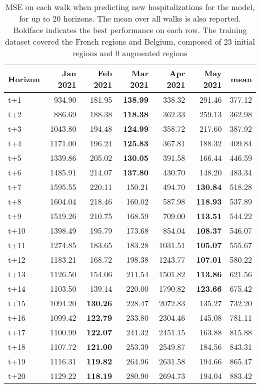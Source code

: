 \begin{table}[H]
\centering
\caption{MSE on each walk when predicting new hospitalizations for the model, for up to 20 horizons. The mean over all walks is also reported. Boldface indicates the best performance on each row. The training dataset covered the French regions and Belgium, composed of 23 initial regions and 0 augmented regions }
\label{tab:MSE_walk_encoder_decoder}
\begin{tabular}{lrrrrrr}
\toprule
Horizon &  Jan 2021 &  Feb 2021 &  Mar 2021 &  Apr 2021 &  May 2021 &   mean \\
\midrule
t+1  & 934.90  & 181.95  & \textbf{138.99}  & 338.32  & 291.46  & 377.12  \\
t+2  & 886.69  & 188.38  & \textbf{118.38}  & 362.33  & 259.13  & 362.98  \\
t+3  & 1043.80  & 194.48  & \textbf{124.99}  & 358.72  & 217.60  & 387.92  \\
t+4  & 1171.00  & 196.24  & \textbf{125.83}  & 367.81  & 188.32  & 409.84  \\
t+5  & 1339.86  & 205.02  & \textbf{130.05}  & 391.58  & 166.44  & 446.59  \\
t+6  & 1485.91  & 214.07  & \textbf{137.80}  & 430.70  & 148.20  & 483.34  \\
t+7  & 1595.55  & 220.11  & 150.21  & 494.70  & \textbf{130.84}  & 518.28  \\
t+8  & 1604.04  & 218.46  & 160.02  & 587.98  & \textbf{118.93}  & 537.89  \\
t+9  & 1519.26  & 210.75  & 168.59  & 709.00  & \textbf{113.51}  & 544.22  \\
t+10  & 1398.49  & 195.79  & 173.68  & 854.04  & \textbf{108.37}  & 546.07  \\
t+11  & 1274.85  & 183.65  & 183.28  & 1031.51  & \textbf{105.07}  & 555.67  \\
t+12  & 1183.21  & 168.72  & 198.38  & 1243.77  & \textbf{107.01}  & 580.22  \\
t+13  & 1126.50  & 154.06  & 211.54  & 1501.82  & \textbf{113.86}  & 621.56  \\
t+14  & 1103.50  & 139.14  & 220.00  & 1790.82  & \textbf{123.66}  & 675.42  \\
t+15  & 1094.20  & \textbf{130.26}  & 228.47  & 2072.83  & 135.27  & 732.20  \\
t+16  & 1099.42  & \textbf{122.79}  & 233.80  & 2304.46  & 145.08  & 781.11  \\
t+17  & 1100.99  & \textbf{122.07}  & 241.32  & 2451.15  & 163.88  & 815.88  \\
t+18  & 1107.72  & \textbf{121.00}  & 253.39  & 2549.87  & 184.56  & 843.31  \\
t+19  & 1116.31  & \textbf{119.82}  & 264.96  & 2631.58  & 194.66  & 865.47  \\
t+20  & 1129.22  & \textbf{118.19}  & 280.90  & 2694.73  & 194.04  & 883.42  \\

\bottomrule
\end{tabular}
\end{table}

